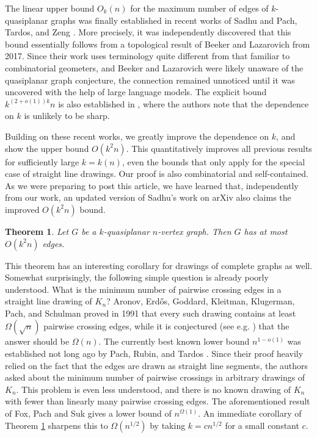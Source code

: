 \documentclass[11pt]{amsart}
\newtheorem{theorem}{Theorem}[section]
\theoremstyle{definition}
\begin{document}
The linear upper bound $O_k(n)$ for the maximum number of edges of $k$-quasiplanar graphs was finally established in recent works of Sadhu \cite{Sadhu} and Pach, Tardos, and Zeng \cite{PTZ}. More precisely, it was independently discovered that this bound essentially follows from a topological result of Beeker and Lazarovich \cite{BL} from 2017. Since their work uses terminology quite different from that familiar to combinatorial geometers, and Beeker and Lazarovich were likely unaware of the quasiplanar graph conjecture, the connection remained unnoticed until it was uncovered with the help of large language models. The explicit bound $k^{(2+o(1))k} n$ is also established in \cite{PTZ}, where the authors note that the dependence on $k$ is unlikely to be sharp.

Building on these recent works, we greatly improve the dependence on $k$, and show the upper bound $O(k^2n)$. This quantitatively improves all previous results for sufficiently large $k=k(n)$, even the bounds that only apply for the special case of straight line drawings. Our proof is also combinatorial and self-contained. As we were preparing to post this article, we have learned that, independently from our work, an updated version of Sadhu's work \cite{Sadhu} on arXiv also claims the improved $O(k^2n)$ bound.

\begin{theorem}\label{thm:main}
Let $G$ be a $k$-quasiplanar $n$-vertex graph. Then $G$ has at most $O(k^2n)$ edges.
\end{theorem}

This theorem has an interesting corollary for drawings of complete graphs as well. Somewhat surprisingly, the following simple question is already poorly understood. What is the minimum number of pairwise crossing edges in a straight line drawing of $K_n$? Aronov, Erd\H{o}s, Goddard, Kleitman, Klugerman, Pach, and Schulman \cite{AEGKKPS} proved in 1991 that every such drawing contains at least $\Omega(\sqrt{n})$ pairwise crossing edges, while it is conjectured (see e.g. \cite{BMP}) that the answer should be $\Omega(n)$. The currently best known lower bound $n^{1-o(1)}$ was established not long ago by Pach, Rubin, and Tardos \cite{PRT}. Since their proof heavily relied on the fact that the edges are drawn as straight line segments, the authors asked about the minimum number of pairwise crossings in arbitrary drawings of $K_n$. This problem is even less understood, and there is no known drawing of $K_n$ with fewer than linearly many pairwise crossing edges. The aforementioned result of Fox, Pach and Suk \cite{FPS} gives a lower bound of $n^{\Omega(1)}$. An immediate corollary of Theorem \ref{thm:main} sharpens this to $\Omega(n^{1/2})$ by taking $k=cn^{1/2}$ for a small constant $c$.
\end{document}
